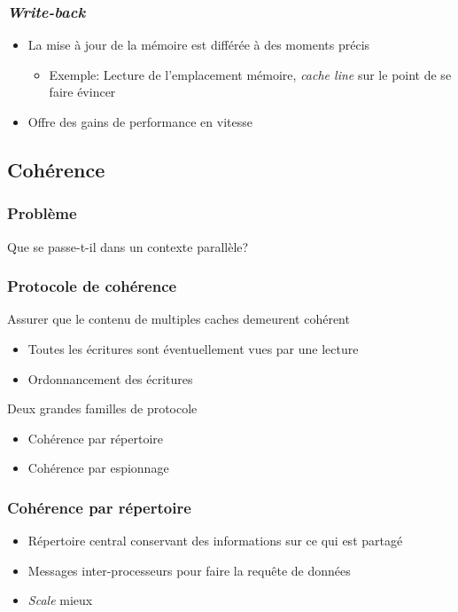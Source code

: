 \documentclass{beamer}
\begin{document}
\begin{frame}
\frametitle{\textit{Write-back}}
\begin{itemize}
\item La mise à jour de la mémoire est différée à des moments précis
\begin{itemize}
\item Exemple: Lecture de l'emplacement mémoire, \textit{cache line} sur le point de se faire évincer
\end{itemize}
\item Offre des gains de performance en vitesse
\end{itemize}
\end{frame}

\subsection{Cohérence}
\begin{frame}
\frametitle{Problème}
\begin{center}
\LARGE{Que se passe-t-il dans un contexte parallèle?}
\end{center}
\end{frame}

\begin{frame}
\frametitle{Protocole de cohérence}
Assurer que le contenu de multiples caches demeurent cohérent
\begin{itemize}
\item Toutes les écritures sont éventuellement vues par une lecture
\item Ordonnancement des écritures
\end{itemize}

Deux grandes familles de protocole
\begin{itemize}
\item Cohérence par répertoire
\item Cohérence par espionnage
\end{itemize}
\end{frame}

\begin{frame}
\frametitle{Cohérence par répertoire}
\begin{itemize}
\item Répertoire central conservant des informations sur ce qui est partagé
\item Messages inter-processeurs pour faire la requête de données
\item \textit{Scale} mieux
\end{itemize}
\end{frame}
\end{document}
